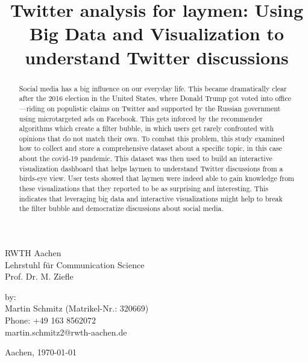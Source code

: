 \documentclass[a4, 12pt]{article}
\title{Twitter analysis for laymen: Using Big Data and Visualization to understand Twitter discussions}\let\Title\@title     %
\begin{document}


\begin{titlepage}
    
    \large
    RWTH Aachen\\
    Lehrstuhl für Communication Science\\
    Prof. Dr. M. Ziefle
    
    \vspace{5cm}
    \Large
    \doublespacing{
        \textit{Master thesis\\}
        \textbf{\Title}
    }
    
    \vspace{7cm}
    \normalsize
    by:\\
    Martin Schmitz (Matrikel-Nr.: 320669)\\
    Phone: +49 163 8562072\\
    martin.schmitz2@rwth-aachen.de
    
    \vfill
    
    Aachen, \today    
\afterpage{\cfoot{\textcolor{hgray}{\thepage}}}
        
\end{titlepage}


\begin{abstract}
    Social media has a big influence on our everyday life. This became dramatically clear after the 2016 election in the United States, where Donald Trump got voted into office---riding on populistic claims on Twitter and supported by the Russian government using microtargeted ads on Facebook. This gets inforced by the recommender algorithms which create a filter bubble, in which users get rarely confronted with opinions that do not match their own.
    To combat this problem, this study examined how to collect and store a comprehensive dataset about a specific topic, in this case about the covid-19 pandemic. This dataset was then used to build an interactive visualization dashboard that helps laymen to understand Twitter discussions from a birds-eye view. User tests showed that laymen were indeed able to gain knowledge from these visualizations that they reported to be as surprising and interesting. This indicates that leveraging big data and interactive visualizations might help to break the filter bubble and democratize discussions about social media. 
\end{abstract}
\end{document}
